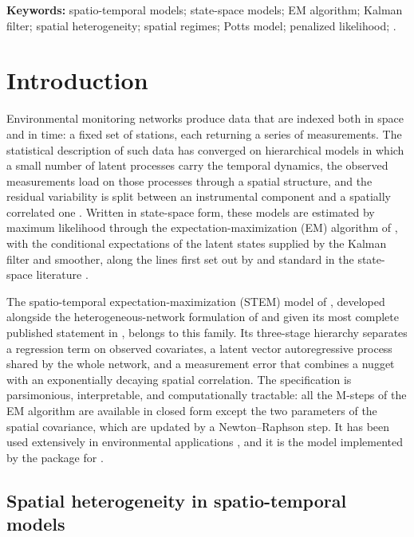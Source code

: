 \noindent\textbf{Keywords:} spatio-temporal models; state-space models; EM algorithm; Kalman filter; spatial heterogeneity; spatial regimes; Potts model; penalized likelihood; \Rlang.

\section{Introduction}\label{sec1}

Environmental monitoring networks produce data that are indexed both in space and in time: a fixed set of stations, each returning a series of measurements. The statistical description of such data has converged on hierarchical models in which a small number of latent processes carry the temporal dynamics, the observed measurements load on those processes through a spatial structure, and the residual variability is split between an instrumental component and a spatially correlated one \citep{CressieWikle2011}. Written in state-space form, these models are estimated by maximum likelihood through the expectation-maximization (EM) algorithm of \citet{DempsterLairdRubin1977}, with the conditional expectations of the latent states supplied by the Kalman filter and smoother, along the lines first set out by \citet{ShumwayStoffer1982} and standard in the state-space literature \citep{DurbinKoopman2012}.

The spatio-temporal expectation-maximization (STEM) model of \citet{FassoCameletti2007}, developed alongside the heterogeneous-network formulation of \citet{FassoCamelettiNicolis2007} and given its most complete published statement in \citet{FassoCameletti2010}, belongs to this family. Its three-stage hierarchy separates a regression term on observed covariates, a latent vector autoregressive process shared by the whole network, and a measurement error that combines a nugget with an exponentially decaying spatial correlation. The specification is parsimonious, interpretable, and computationally tractable: all the M-steps of the EM algorithm are available in closed form except the two parameters of the spatial covariance, which are updated by a Newton--Raphson step. It has been used extensively in environmental applications \citep{CamelettiEtAl2011}, and it is the model implemented by the \Stem{} package for \Rlang{} \citep{StemPackage}.

\subsection{Spatial heterogeneity in spatio-temporal models}\label{sec1:het}

